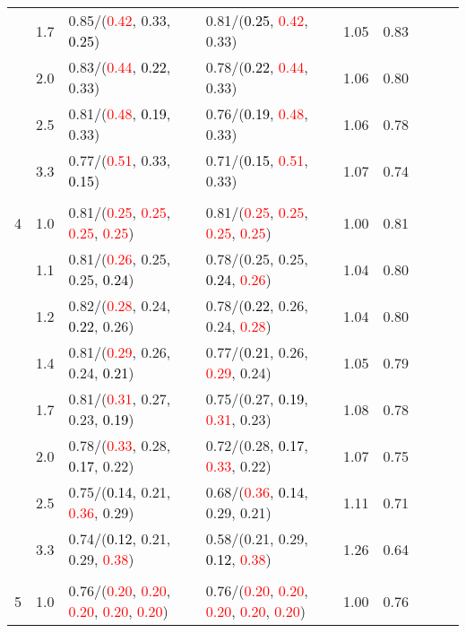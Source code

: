 \documentclass[10pt,a4paper]{report}
\begin{document}
\begin{table}[!htbp]
\begin{center}
{\begin{tabular}{ccllccccc}
			&1.7&0.85/(\textcolor{red}{0.42}, 0.33, \textcolor{black}{0.25})&0.81/(\textcolor{black}{0.25}, \textcolor{red}{0.42}, 0.33)&1.05&0.83\\
			&2.0&0.83/(\textcolor{red}{0.44}, \textcolor{black}{0.22}, 0.33)&0.78/(\textcolor{black}{0.22}, \textcolor{red}{0.44}, 0.33)&1.06&0.80\\
			&2.5&0.81/(\textcolor{red}{0.48}, \textcolor{black}{0.19}, 0.33)&0.76/(\textcolor{black}{0.19}, \textcolor{red}{0.48}, 0.33)&1.06&0.78\\
			&3.3&0.77/(\textcolor{red}{0.51}, 0.33, \textcolor{black}{0.15})&0.71/(\textcolor{black}{0.15}, \textcolor{red}{0.51}, 0.33)&1.07&0.74\\
			&&&&\\
			4			&1.0&0.81/(\textcolor{red}{0.25}, \textcolor{red}{0.25}, \textcolor{red}{0.25}, \textcolor{red}{0.25})&0.81/(\textcolor{red}{0.25}, \textcolor{red}{0.25}, \textcolor{red}{0.25}, \textcolor{red}{0.25})&1.00&0.81\\
			&1.1&0.81/(\textcolor{red}{0.26}, 0.25, 0.25, \textcolor{black}{0.24})&0.78/(0.25, 0.25, \textcolor{black}{0.24}, \textcolor{red}{0.26})&1.04&0.80\\
			&1.2&0.82/(\textcolor{red}{0.28}, 0.24, \textcolor{black}{0.22}, 0.26)&0.78/(\textcolor{black}{0.22}, 0.26, 0.24, \textcolor{red}{0.28})&1.04&0.80\\
			&1.4&0.81/(\textcolor{red}{0.29}, 0.26, 0.24, \textcolor{black}{0.21})&0.77/(\textcolor{black}{0.21}, 0.26, \textcolor{red}{0.29}, 0.24)&1.05&0.79\\
			&1.7&0.81/(\textcolor{red}{0.31}, 0.27, 0.23, \textcolor{black}{0.19})&0.75/(0.27, \textcolor{black}{0.19}, \textcolor{red}{0.31}, 0.23)&1.08&0.78\\
			&2.0&0.78/(\textcolor{red}{0.33}, 0.28, \textcolor{black}{0.17}, 0.22)&0.72/(0.28, \textcolor{black}{0.17}, \textcolor{red}{0.33}, 0.22)&1.07&0.75\\
			&2.5&0.75/(\textcolor{black}{0.14}, 0.21, \textcolor{red}{0.36}, 0.29)&0.68/(\textcolor{red}{0.36}, \textcolor{black}{0.14}, 0.29, 0.21)&1.11&0.71\\
			&3.3&0.74/(\textcolor{black}{0.12}, 0.21, 0.29, \textcolor{red}{0.38})&0.58/(0.21, 0.29, \textcolor{black}{0.12}, \textcolor{red}{0.38})&1.26&0.64\\
			&&&&\\
			5			&1.0&0.76/(\textcolor{red}{0.20}, \textcolor{red}{0.20}, \textcolor{red}{0.20}, \textcolor{red}{0.20}, \textcolor{red}{0.20})&0.76/(\textcolor{red}{0.20}, \textcolor{red}{0.20}, \textcolor{red}{0.20}, \textcolor{red}{0.20}, \textcolor{red}{0.20})&1.00&0.76\\

\end{tabular}}
\end{center}
\end{table}
\end{document}
